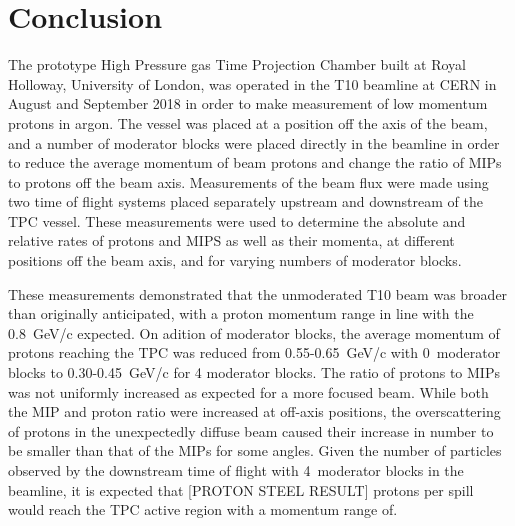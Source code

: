 \section{Conclusion}
\label{hptpcPaper:sec:Conclusion}

The prototype High Pressure gas Time Projection Chamber built at Royal Holloway, University of London, was operated in the T10 beamline at CERN in August and September 2018 in order to make measurement of low momentum protons in argon.
The vessel was placed at a position off the axis of the beam, and a number of moderator blocks were placed directly in the beamline in order to reduce the average momentum of beam protons and change the ratio of MIPs to protons off the beam axis.
Measurements of the beam flux were made using two time of flight systems placed separately upstream and downstream of the TPC vessel. 
These measurements were used to determine the absolute and relative rates of protons and MIPS as well as their momenta, at different positions off the beam axis, and for varying numbers of moderator blocks.

These measurements demonstrated that the unmoderated T10 beam was broader than originally anticipated, with a proton momentum range in line with the 0.8~GeV/c expected.
On adition of moderator blocks, the average momentum of protons reaching the TPC was reduced from 0.55-0.65~GeV/c with 0~moderator blocks to 0.30-0.45~GeV/c for 4 moderator blocks.
The ratio of protons to MIPs was not uniformly increased as expected for a more focused beam. While both the MIP and proton ratio were increased at off-axis positions, the overscattering of protons in the unexpectedly diffuse beam caused their increase in number to be smaller than that of the MIPs for some angles.
Given the number of particles observed by the downstream time of flight with 4~moderator blocks in the beamline, it is expected that [PROTON STEEL RESULT] protons per spill would reach the TPC active region with a momentum range of.

